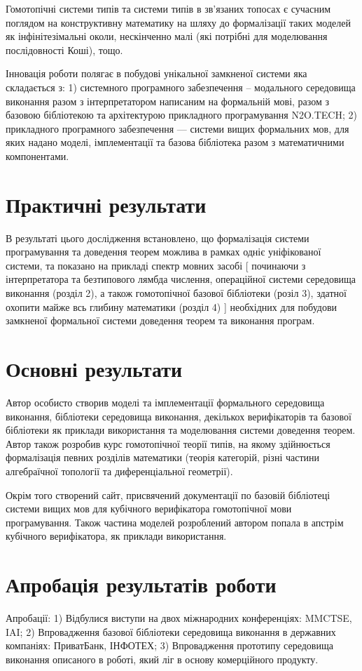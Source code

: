 Гомотопічні системи типів та системи типів в зв'язаних топосах є сучасним поглядом на
конструктивну математику на шляху до формалізації таких моделей як інфінітезімальні околи,
нескінченно малі (які потрібні для моделювання послідовності Коші), тощо.

Інновація роботи полягає в побудові унікальної замкненої системи яка складається з:
1) системного програмного забезпечення -- модального середовища виконання разом з інтерпретатором
написаним на формальній мові, разом з базовою бібліотекою та архітектурою прикладного програмування N2O.TECH;
2) прикладного програмного забезпечення --- системи вищих формальних мов, для яких надано моделі,
імплементації та базова бібліотека разом з математичними компонентами.

\section{Практичні результати}
В результаті цього дослідження встановлено, що формалізація системи
програмування та доведення теорем можлива в рамках одніє уніфікованої
системи, та показано на прикладі спектр мовних засобі [ починаючи з інтерпретатора
та безтипового лямбда числення, операційної системи середовища виконання (розділ 2),
а також гомотопічної базової бібліотеки (розіл 3), здатної охопити майже всь
глибину математики (розділ 4) ] необхідних для побудови замкненої формальної системи
доведення теорем та виконання програм.

\section{Основні результати}
Автор особисто створив моделі та імплементації формального середовища виконання,
бібліотеки середовища виконання, декількох верифікаторів та базової бібліотеки
як приклади використання та моделювання системи доведення теорем. Автор також
розробив курс гомотопічної теорії типів, на якому здійнюється формалізація
певних розділів математики (теорія категорій, різні частини алгебраїчної
топології та диференціальної геометрії).

Окрім того створений сайт, присвячений документації по базовій бібліотеці системи вищих мов
для кубічного верифікатора гомотопічної мови програмування. Також частина
моделей розроблений автором попала в апстрім кубічного верифікатора,
як приклади використання.

\section{Апробація результатів роботи}
Апробації: 1) Відбулися виступи на двох міжнародних конференціях: MMCTSE, IAI;
2) Впровадження базової бібліотеки середовища виконання в державних компаніях: ПриватБанк, ІНФОТЕХ;
3) Впровадження прототипу середовища виконання описаного в роботі, який ліг в основу комерційного продукту.

